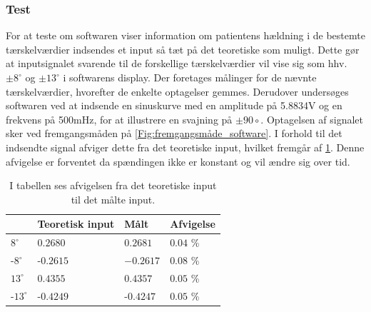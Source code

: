 \subsubsection{Test}
For at teste om softwaren viser information om patientens hældning i de bestemte tærskelværdier indsendes et input så tæt på det teoretiske som muligt. Dette gør at inputsignalet svarende til de forskellige tærskelværdier vil vise sig som hhv. $\pm 8^{\circ}$ og $\pm 13^{\circ}$ i softwarens display. Der foretages målinger for de nævnte tærskelværdier, hvorefter de enkelte optagelser gemmes.
Derudover undersøges softwaren ved at indsende en sinuskurve med en amplitude på 5.8834V og en frekvens på 500mHz, for at illustrere en svajning på $\pm90{\circ}$. Optagelsen af signalet sker ved fremgangsmåden på \ref{Fig:fremgangsmåde_software}. I forhold til det indsendte signal afviger dette fra det teoretiske input, hvilket fremgår af \ref{Tab:afvigelse_software}. Denne afvigelse er forventet da spændingen ikke er konstant og vil ændre sig over tid. 

\begin{table}[H]
\centering
\begin{tabular}{llll}
             & Teoretisk input & Målt 	& Afvigelse \\ \hline
$8^{\circ}$   & $0.2680$          & $0.2681$  & $0.04$ \% \\ \hline
-$8^{\circ}$   & -$0.2615$         & $-0.2617$ & $0.08$ \%  \\ \hline
$13^{\circ}$  & $0.4355$          & $0.4357$  & $0.05$ \% \\ \hline
-$13^{\circ}$ & -$0.4249$         & -$0.4247$ & $0.05$ \% \\ \hline    
\end{tabular}
\caption{I tabellen ses afvigelsen fra det teoretiske input til det målte input.}
\label{Tab:afvigelse_software}
\end{table}

